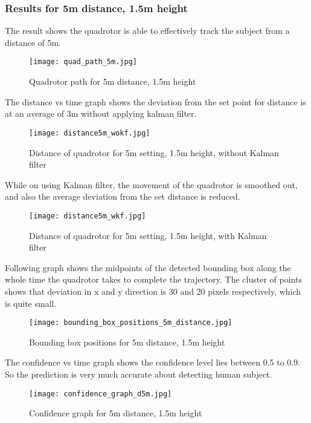\subsubsection{Results for 5m distance, 1.5m height}
The result shows the quadrotor is able to effectively track the subject from a distance of 5m.

\begin{figure}[htb]
	\centering
	\texttt{[image: quad\_path\_5m.jpg]}
	\caption{Quadrotor path for 5m distance, 1.5m height\label{Quadrotor path for 5m distance, 1.5m height}}
\end{figure}

The distance vs time graph shows the deviation from the set point for distance is at an average of 3m without applying kalman filter. 
\begin{figure}[!htb]
	\centering
	\texttt{[image: distance5m\_wokf.jpg]}
	\caption{Distance of quadrotor for 5m setting, 1.5m height, without Kalman filter\label{Distance of quadrotor for 5m setting, 1.5m height, without Kalman filter}}
\end{figure}
\newpage
While on using Kalman filter, the movement of the quadrotor is smoothed out, and also the average deviation from the set distance is reduced.
\begin{figure}[!htb]
	\centering
	\texttt{[image: distance5m\_wkf.jpg]}
	\caption{Distance of quadrotor for 5m setting, 1.5m height, with Kalman filter\label{Distance of quadrotor for 5m setting, 1.5m height, with Kalman filter}}
\end{figure}

Following graph shows the midpoints of the detected bounding box along the whole time the quadrotor takes to complete the trajectory. The cluster of points shows that deviation in x and y direction is 30 and 20 pixels respectively, which is quite small.
\begin{figure}[!htb]
	\centering
	\texttt{[image: bounding\_box\_positions\_5m\_distance.jpg]}
	\caption{Bounding box positions for 5m distance, 1.5m height\label{Bounding box positions for 5m distance, 1.5m height}}
\end{figure}

The confidence vs time graph shows the confidence level lies between 0.5 to 0.9. So the prediction is very much accurate about detecting human subject.
\begin{figure}[!htb]
	\centering
	\texttt{[image: confidence\_graph\_d5m.jpg]}
	\caption{Confidence graph for 5m distance, 1.5m height\label{Confidence graph for 5m distance, 1.5m height}}
\end{figure}

